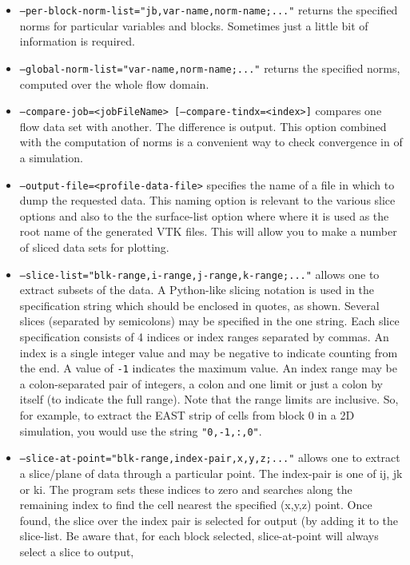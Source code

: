 \begin{itemize}
  \item \texttt{--per-block-norm-list="jb,var-name,norm-name;..."} returns the specified norms 
     for particular variables and blocks.  Sometimes just a little bit of information is required.
  \item \texttt{--global-norm-list="var-name,norm-name;..."} returns the specified norms,
     computed over the whole flow domain.
  \item \texttt{--compare-job=<jobFileName> [--compare-tindx=<index>]} compares one flow data set with another.
     The difference is output.  This option combined with the computation of norms is a convenient way to check
     convergence in of a simulation.
  \item \texttt{--output-file=<profile-data-file>} specifies the name of a file in which to dump the requested data.
     This naming option is relevant to the various slice options and also to the the surface-list option where
     where it is used as the root name of the generated VTK files.
     This will allow you to make a number of sliced data sets for plotting.
  \item \texttt{--slice-list="blk-range,i-range,j-range,k-range;..."} allows one to extract subsets of the data.
     A Python-like slicing notation is used in the specification string which should be enclosed in quotes, as shown. 
     Several slices (separated by semicolons) may be specified in the one string.
     Each slice specification consists of 4 indices or index ranges separated by commas.  
     An index is a single integer value and may be negative to indicate counting from the end.
     A value of \texttt{-1} indicates the maximum value.
     An index range may be a colon-separated pair of integers, a colon and one limit 
     or just a colon by itself (to indicate the full range).
     Note that the range limits are inclusive.
     So, for example, to extract the EAST strip of cells from block 0 in a 2D simulation, you would use
     the string \texttt{"0,-1,:,0"}.
  \item \texttt{--slice-at-point="blk-range,index-pair,x,y,z;..."} allows one to extract a slice/plane of data
     through a particular point.
     The index-pair is one of ij, jk or ki.  
     The program sets these indices to zero and searches along the remaining index to find the cell nearest 
     the specified (x,y,z) point.
     Once found, the slice over the index pair is selected for output (by adding it to the slice-list.
     Be aware that, for each block selected, slice-at-point will always select a slice to output, 

\end{itemize}
